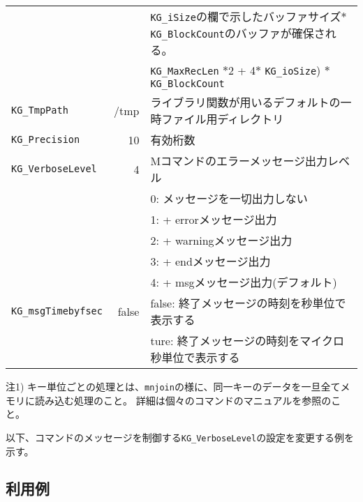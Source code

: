 \begin{table}[htpb]
\begin{center}
{\begin{tabular}{l|r|l}
                         &         & \verb|KG_iSize|の欄で示したバッファサイズ$*$\verb|KG_BlockCount|のバッファが確保される。\\
                         &         & \verb|KG_MaxRecLen| $*$2 + 4$*$ \verb|KG_ioSize|) $*$ \verb|KG_BlockCount| \\
\hline
\verb|KG_TmpPath|        & /tmp    & ライブラリ関数が用いるデフォルトの一時ファイル用ディレクトリ \\
\hline
\verb|KG_Precision|      & 10      & 有効桁数 \\
\hline
\verb|KG_VerboseLevel|   &       4 & Mコマンドのエラーメッセージ出力レベル \\
                         &         & 0: メッセージを一切出力しない \\
                         &         & 1: + errorメッセージ出力 \\
                         &         & 2: + warningメッセージ出力 \\
                         &         & 3: + endメッセージ出力 \\
                         &         & 4: + msgメッセージ出力(デフォルト) \\
\hline
\verb|KG_msgTimebyfsec|  & false   & false: 終了メッセージの時刻を秒単位で表示する \\
                         &         & ture: 終了メッセージの時刻をマイクロ秒単位で表示する \\
\hline
\end{tabular}  
}
注1) キー単位ごとの処理とは、\verb|mnjoin|の様に、同一キーのデータを一旦全てメモリに読み込む処理のこと。
詳細は個々のコマンドのマニュアルを参照のこと。
\end{center}
\end{table}  

以下、コマンドのメッセージを制御する\verb|KG_VerboseLevel|の設定を変更する例を示す。

\subsection*{利用例}


%

